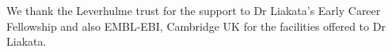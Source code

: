 \documentclass{svmult}
\begin{document}
\vspace{-10pt}
\begin{acknowledgement} We thank the Leverhulme trust for the support to Dr
Liakata's Early Career Fellowship and also EMBL-EBI, Cambridge UK for the
facilities offered to Dr Liakata.  \end{acknowledgement}
\vspace{-2pt}

\vspace{-30pt}



%
\end{document}
